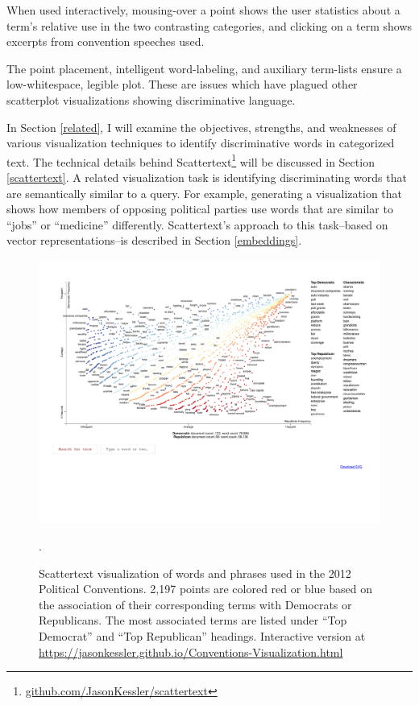 \documentclass[11pt,a4paper]{article}
\begin{document}
When used interactively, mousing-over a point shows the user statistics about a term's relative use in the two contrasting categories, and clicking on a term shows excerpts from convention speeches used.  

The point placement, intelligent word-labeling, and auxiliary term-lists ensure a low-whitespace, legible plot.  These are issues which have plagued other scatterplot visualizations showing discriminative language.

In Section \ref{related}, I will examine the objectives, strengths, and weaknesses of various visualization techniques to identify discriminative words in categorized text. The technical details behind Scattertext\footnote{\href{http://www.github.com/JasonKessler/scattertext}{github.com/JasonKessler/scattertext}} will be discussed in Section \ref{scattertext}. A related visualization task is identifying discriminating words that are semantically similar to a query.  For example, generating a visualization that shows how members of opposing political parties use words that are similar to ``jobs'' or ``medicine'' differently. Scattertext's approach to this task--based on vector representations--is described in Section \ref{embeddings}.
\begin{figure}[h!!]
  \includegraphics[width=\linewidth,scale=0.8]{primary_scattertext}
  \caption{Scattertext visualization of words and phrases used in the 2012 Political Conventions.  2,197 points are colored red or blue based on the association of their corresponding terms with Democrats or Republicans.  The most associated terms are listed under ``Top Democrat'' and ``Top Republican'' headings. Interactive version at \href{https://jasonkessler.github.io/Conventions-Visualization.html}{https://jasonkessler.github.io/Conventions-Visualization.html}}.
\label{scattertextmain}
\vspace{-0.5cm}
\end{figure}
\end{document}
